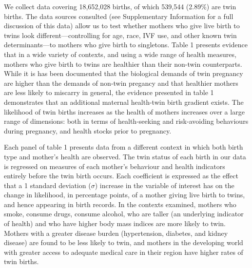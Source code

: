 \documentclass{nature}
\begin{document}
\begin{linenumbers}
%
We collect data covering 18,652,028 births, of which 539,544 (2.89\%) are twin births.  %
The data sources consulted (see Supplementary Information for a full discussion of this data) allow us to test whether mothers who give live birth to twins look different---controlling for age, race, IVF use, and other known twin determinants\cite{Hoekstraetal2008}---to mothers who give birth to singletons.  Table 1 presents evidence that in a wide variety of contexts, and using a wide range of health measures, mothers who give birth to twins are healthier than their non-twin counterparts.  While it is has been documented that the biological demands of twin pregnancy are higher than the demands of non-twin pregancy\cite{Shinagawaetal2005,Kahnetal2003} and that healthier mothers are less likely to miscarry in general\cite{Frettsetal1995,Garciaetal2002}, the evidence presented in table 1 demonstrates that an additional maternal health-twin birth gradient exists. The likelihood of twin births increases as the health of mothers increases over a large range of dimensions: both in terms of health-seeking and risk-avoiding behaviours during pregnancy, and health stocks prior to pregnancy.

Each panel of table 1 presents data from a different context in which both birth type and mother's health are observed.  The twin status of each birth in our data is regressed on measures of each mother's behaviour and health indicators entirely before the twin birth occurs.  Each coefficient is expressed as the effect that a 1 standard deviation ($\sigma$) increase in the variable of interest has on the change in likelihood, in percentage points, of a mother giving live birth to twins, and hence appearing in birth records.  In the contexts examined, mothers who smoke, consume drugs, consume alcohol, who are taller (an underlying indicator of health\cite{Silventoinen2003,BhalotraRawlings2013}) and who have higher body mass indices are more likely to twin.  Mothers with a greater disease burden (hypertension, diabetes, and kidney disease) are found to be less likely to twin, and mothers in the developing world with greater access to adequate medical care in their region have higher rates of twin births.


\end{linenumbers}
\end{document}
